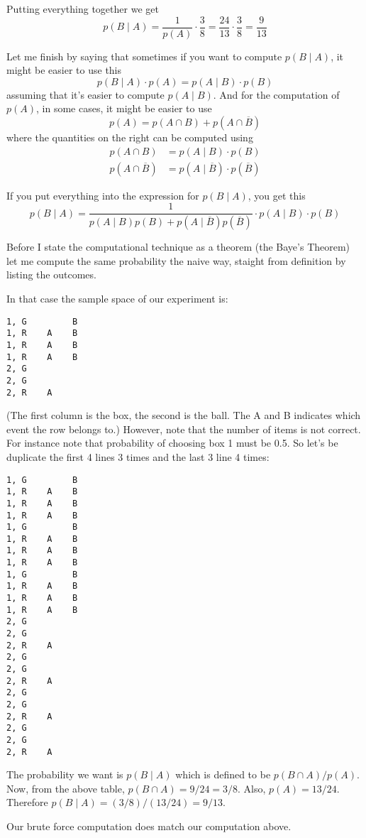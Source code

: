 Putting everything together we get
\[
p(B \mid  A)
= \frac{1}{p(A)} \cdot \frac{3}{8}
= \frac{24}{13} \cdot \frac{3}{8}
= \frac{9}{13}
\]

Let me finish by saying that sometimes if you want to compute 
$p(B\mid A)$, it might be easier to use this
\[
p(B \mid A) \cdot p(A) 
= 
p(A \mid B) \cdot p(B)
\]
assuming that it's easier to compute $p(A \mid B)$.
And for the computation of $p(A)$, in some cases,
it might be easier to use
\[
p(A) = p(A \cap B) + p(A \cap \overline B)
\]
where the quantities on the right can be computed using
\begin{align*}
p(A \cap B) &= p(A \mid B) \cdot p(B) \\
p(A \cap \overline B) &= p(A \mid \overline B) \cdot p(\overline B)
\end{align*}

If you put everything into the expression for $p(B \mid A)$, you get this
\[
p(B \mid A)
=
\frac{1}{p(A \mid B) p(B) + p(A \mid \overline B) p(\overline B)}
\cdot 
p(A \mid B) \cdot p(B)
\]

Before I state the computational technique as a theorem 
(the Baye's Theorem) let me compute the same probability
the naive way, staight from definition by listing the 
outcomes.

In that case the sample space of our experiment is:
\begin{Verbatim}[fontsize=\small, frame=single]
1, G         B
1, R    A    B
1, R    A    B
1, R    A    B   
2, G
2, G
2, R    A
\end{Verbatim}
(The first column is the box, the second is the ball. The A and B
indicates which event the row belongs to.)
However, note that the number of items is not correct.
For instance note that probability of choosing box 1 must be 0.5.
So let's be duplicate the first 4 lines 3 times and the last 3 line 4 times:
\begin{Verbatim}[fontsize=\small, frame=single]
1, G         B
1, R    A    B
1, R    A    B
1, R    A    B   
1, G         B
1, R    A    B
1, R    A    B
1, R    A    B   
1, G         B
1, R    A    B
1, R    A    B
1, R    A    B   
2, G
2, G
2, R    A
2, G
2, G
2, R    A
2, G
2, G
2, R    A
2, G
2, G
2, R    A
\end{Verbatim}
The probability we want is $p(B \mid A)$ which is defined to be
$p(B \cap A)/p(A)$.
Now, from the above table, $p(B \cap A) = 9/24 = 3/8$.
Also, $p(A) = 13/24$.
Therefore $p(B \mid A) = (3/8)/(13/24) = 9/13$.

Our brute force computation does match our computation above.

